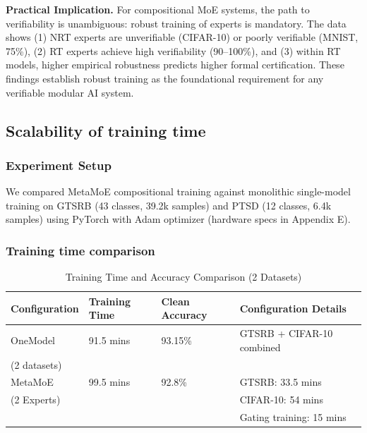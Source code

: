 \documentclass[11pt,a4paper]{article}
\begin{document}
\textbf{Practical Implication.} For compositional MoE systems, the path to verifiability is unambiguous: robust training of experts is mandatory. The data shows (1) NRT experts are unverifiable (CIFAR-10) or poorly verifiable (MNIST, 75\%), (2) RT experts achieve high verifiability (90--100\%), and (3) within RT models, higher empirical robustness predicts higher formal certification. These findings establish robust training as the foundational requirement for any verifiable modular AI system.

\subsection{Scalability of training time}

\subsubsection{Experiment Setup}

We compared MetaMoE compositional training against monolithic single-model training on GTSRB (43 classes, 39.2k samples) and PTSD (12 classes, 6.4k samples) using PyTorch with Adam optimizer (hardware specs in Appendix E).

\subsubsection{Training time comparison}

\begin{table}[H]
\centering
\begin{tabular}{llll}
\toprule
\textbf{Configuration} & \textbf{Training Time} & \textbf{Clean Accuracy} & \textbf{Configuration Details} \\
\midrule
OneModel & 91.5 mins & 93.15\% & GTSRB + CIFAR-10 combined \\
(2 datasets) & & & \\
MetaMoE & 99.5 mins & 92.8\% & GTSRB: 33.5 mins \\
(2 Experts) & & & CIFAR-10: 54 mins \\
 & & & Gating training: 15 mins \\
\bottomrule
\end{tabular}
\caption{Training Time and Accuracy Comparison (2 Datasets)}
\end{table}
\end{document}
